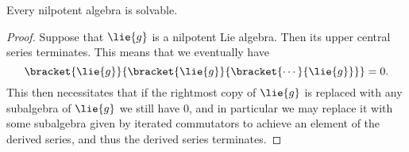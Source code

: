 \documentclass[fleqn]{NotesClass}
\begin{document}
    \begin{lma}{}{}
        Every nilpotent algebra is solvable.
        \begin{proof}
            Suppose that \(\lie{g}\) is a nilpotent Lie algebra.
            Then its upper central series terminates.
            This means that we eventually have
            \begin{equation}
                \bracket{\lie{g}}{\bracket{\lie{g}}{\bracket{\dotsb}{\lie{g}}}} = 0.
            \end{equation}
            This then necessitates that if the rightmost copy of \(\lie{g}\) is replaced with any subalgebra of \(\lie{g}\) we still have \(0\), and in particular we may replace it with some subalgebra given by iterated commutators to achieve an element of the derived series, and thus the derived series terminates.
        \end{proof}
    \end{lma}
    
\end{document}
